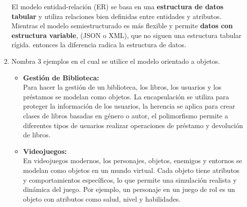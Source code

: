 \documentclass[a4paper,12pt]{article}
\begin{document}
\begin{enumerate}
    \textcolor{water}{El modelo entidad-relación (ER) se basa en una \textbf{estructura de datos tabular} y utiliza relaciones bien definidas entre entidades y atributos. Mientras el modelo semiestructurado es más flexible y permite \textbf{datos con estructura variable},  (JSON o XML), que no siguen una estructura tabular rígida. entonces la diferencia radica la estructura de datos.}

    \item \textcolor{sun}{Nombra 3 ejemplos en el cual se utilice el modelo orientado a objetos.}
    \begin{itemize}
      \item \textcolor{water}{\textbf{Gestión de Biblioteca:}}\\
      Para hacer la gestión de un biblioteca, los libros, los usuarios y los préstamos se modelan como objetos.
       La encapsulación se utiliza para proteger la información de los usuarios, la herencia se aplica para crear clases de libros 
       basadas en género o autor, el polimorfismo permite a diferentes tipos de usuarios realizar operaciones de préstamo y 
       devolución de libros.

      \item \textcolor{water}{\textbf{Videojuegos:}}\\
       En videojuegos modernos, los personajes, objetos, enemigos y entornos se modelan como objetos en un mundo virtual.
        Cada objeto tiene atributos y comportamientos específicos, lo que permite una simulación realista y dinámica del juego.
         Por ejemplo, un personaje en un juego de rol es un objeto con atributos como salud, nivel y habilidades.


\end{itemize}
\end{enumerate}
\end{document}
